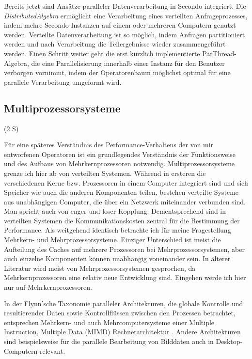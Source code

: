 \documentclass[a4paper,12pt,twoside]{article}
\newcommand{\Fb}[1]{\textit{#1}} %
\begin{document}
Bereits jetzt sind Ansätze paralleler Datenverarbeitung in Secondo integriert. Die \Fb{DistributedAlgebra} {\autocite{Nidzwetzki2017}} ermöglicht eine Verarbeitung eines verteilten Anfrageprozesses, indem mehre Secondo-Instanzen auf einem oder mehreren Computern genutzt werden. Verteilte Datenverarbeitung ist so möglich, indem Anfragen partitioniert werden und nach Verarbeitung die Teilergebnisse wieder zusammengeführt werden. Einen Schritt weiter geht die erst kürzlich implementierte ParThread-Algebra, die eine Parallelisierung innerhalb einer Instanz für den Benutzer verborgen vornimmt, indem der Operatorenbaum möglichst optimal für eine parallele Verarbeitung umgeformt wird.

\subsection{Multiprozessorsysteme} (2 S)

Für eine späteres Verständnis des Performance-Verhaltens der von mir entworfenen Operatoren ist ein grundlegendes Verständnis der Funktionsweise und des Aufbaus von Mehrkernprozessoren notwendig. Multiprozessorsysteme grenze ich hier ab von verteilten Systemen. Während in ersteren die verschiedenen Kerne bzw. Prozessoren in einem Computer integriert sind und sich Speicher wie auch die anderen Komponenten teilen, bestehen verteilte Systeme aus unabhängigen Computer, die über ein Netzwerk miteinander verbunden sind. Man spricht auch von enger und loser Kopplung. Dementsprechend sind in verteilten Systemen die Kommunikationskosten zentral für die Bestimmung der Performance. Als weitgehend identisch betrachte ich für meine Fragestellung Mehrkern- und Mehrprozessorsysteme. Einziger Unterschied ist meist die Aufteilung des Caches auf mehrere Prozessoren bei Mehrprozessorsystemen, aber auch einzelne Komponenten können unabhängig voneinander sein. In älterer Literatur wird meist von Mehrprozessorsystemen gesprochen, da Mehrkernprozessoren eine relativ neue Entwicklung sind. Eingehen werde ich hier nur auf Mehrkernprozessoren.

In der Flynn’sche Taxonomie paralleler Architekturen, die globale Kontrolle und resultierender Daten sowie Kontrollflüssen zwischen den Prozessen betrachtet, entsprechen Mehrkern- und auch Mehrcomputersysteme einer Multiple Instruction, Multiple Data (MIMD) Rechnerarchitektur {\autocite[S. 10f]{Rauber2013}}. Andere Architekturen sind beispielsweise für die parallele Bearbeitung von Bilddaten auch in Desktop-Computern relevant.
\end{document}
